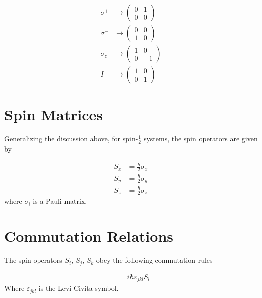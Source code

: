 \documentclass[book.tex]{subfiles}
\begin{document}
\begin{align}
    \sigma^+ &\longrightarrow \begin{pmatrix}
0 & 1 \\
0 & 0 
\end{pmatrix} \\
    \sigma^- &\longrightarrow \begin{pmatrix}
0 & 0 \\
1 & 0 
\end{pmatrix} \\
\sigma_z &\longrightarrow \begin{pmatrix}
1 & 0 \\
0 & -1 
\end{pmatrix} \\
I &\longrightarrow \begin{pmatrix}
1 & 0 \\
0 & 1
\end{pmatrix} 
\end{align}


\section{Spin Matrices}

Generalizing the discussion above, for spin-$\frac{1}{2}$ systems, the spin operators are given by

\begin{align}
    S_x &= \frac{\hbar}{2} \sigma_x \\
    S_y &= \frac{\hbar}{2} \sigma_y \\
    S_z &= \frac{\hbar}{2} \sigma_z
\end{align}
where $\sigma_i$ is a Pauli matrix.

\section{Commutation Relations}

The spin operators $S_i$, $S_j$, $S_k$ obey the following commutation rules

\begin{align}
    [S_j, S_k] &= i \hbar \varepsilon_{jkl} S_l
\end{align}
Where $\varepsilon_{jkl}$ is the Levi-Civita symbol.

\end{document}
